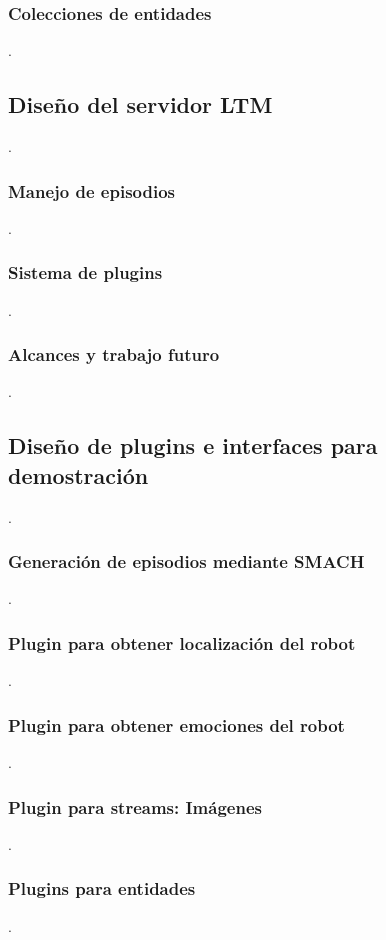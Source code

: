 \subsubsection{Colecciones de entidades}

 .

\subsection{Diseño del servidor LTM}
 .

\subsubsection{Manejo de episodios}
 .

\subsubsection{Sistema de plugins}
 .

\subsubsection{Alcances y trabajo futuro}
 .

\subsection{Diseño de plugins e interfaces para demostración}
 .

\subsubsection{Generación de episodios mediante SMACH}
 .

\subsubsection{Plugin para obtener localización del robot}
 .

\subsubsection{Plugin para obtener emociones del robot}
 .

\subsubsection{Plugin para streams: Imágenes}
 .

\subsubsection{Plugins para entidades}
 .


